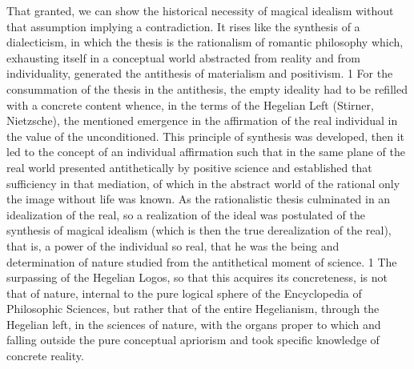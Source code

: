 That granted, we can show the historical necessity of magical idealism without that assumption implying a contradiction. It rises like the synthesis of a dialecticism, in which the thesis is the rationalism of romantic philosophy which, exhausting itself in a conceptual world abstracted from reality and from individuality, generated the antithesis of materialism and positivism. 1 For the consummation of the thesis in the antithesis, the empty ideality had to be refilled with a concrete content whence, in the terms of the Hegelian Left (Stirner, Nietzsche), the mentioned emergence in the affirmation of the real individual in the value of the unconditioned. This principle of synthesis was developed, then it led to the concept of an individual affirmation such that in the same plane of the real world presented antithetically by positive science and established that sufficiency in that mediation, of which in the abstract world of the rational only the image without life was known. As the rationalistic thesis culminated in an idealization of the real, so a realization of the ideal was postulated of the synthesis of magical idealism (which is then the true derealization of the real), that is, a power of the individual so real, that he was the being and determination of nature studied from the antithetical moment of science. 1 The surpassing of the Hegelian Logos, so that this acquires its concreteness, is not that of nature, internal to the pure logical sphere of the Encyclopedia of Philosophic Sciences, but rather that of the entire Hegelianism, through the Hegelian left, in the sciences of nature, with the organs proper to which and falling outside the pure conceptual apriorism and took specific knowledge of concrete reality.


